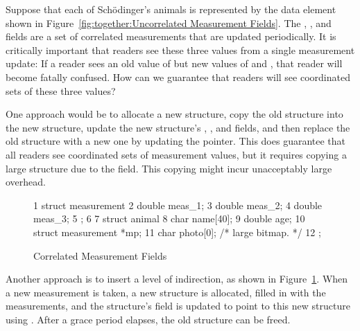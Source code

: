 Suppose that each of Sch\"odinger's animals is represented by the
data element shown in
Figure~\ref{fig:together:Uncorrelated Measurement Fields}.
The , , and  fields are a set
of correlated measurements that are updated periodically.
It is critically important that readers see these three values from
a single measurement update: If a reader sees an old value of
 but new values of  and , that
reader will become fatally confused.
How can we guarantee that readers will see coordinated sets of these
three values?

One approach would be to allocate a new  structure,
copy the old structure into the new structure, update the new
structure's , , and  fields,
and then replace the old structure with a new one by updating
the pointer.
This does guarantee that all readers see coordinated sets of
measurement values, but it requires copying a large structure due
to the  field.
This copying might incur unacceptably large overhead.

\begin{figure}[tbp]
{ \scriptsize
\begin{verbbox}
 1 struct measurement {
 2   double meas_1;
 3   double meas_2;
 4   double meas_3;
 5 };
 6 
 7 struct animal {
 8   char name[40];
 9   double age;
10   struct measurement *mp;
11   char photo[0]; /* large bitmap. */
12 };
\end{verbbox}
}
\centering
\theverbbox
\caption{Correlated Measurement Fields}
\label{fig:together:Correlated Measurement Fields}
\end{figure}

Another approach is to insert a level of indirection, as shown in
Figure~\ref{fig:together:Correlated Measurement Fields}.
When a new measurement is taken, a new  structure
is allocated, filled in with the measurements, and the 
structure's  field is updated to point to this new
 structure using .
After a grace period elapses, the old  structure
can be freed.

